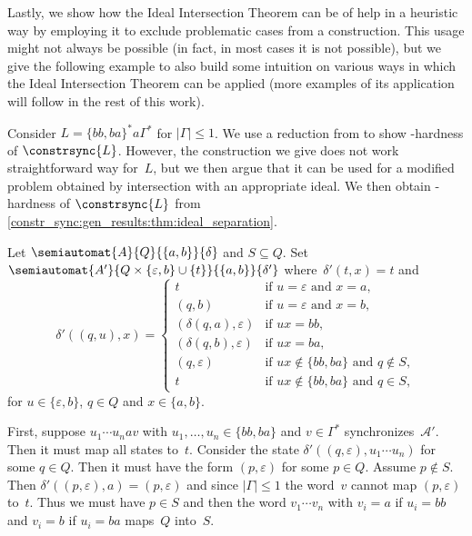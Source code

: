 Lastly, we show how the Ideal Intersection Theorem  can be of help
in a heuristic way by employing it to exclude problematic
cases from a construction. This usage might not always be possible (in fact, in most cases it is not 
possible),
but we give the following example to also build some intuition
on various ways in which the Ideal Intersection Theorem 
can be applied (more examples of its application 
will follow in the rest of this work).

\begin{remark} \label{constrsync:rem:construction-ideal-intersection}
	Consider $L = \{bb,ba\}^*a\Gamma^*$ for $|\Gamma|\le 1$.
	We use a reduction from \SIS
	to show \PSPACE-hardness of $\constrsync{L}$.
	However, the construction we give
	does not work straightforward way for~$L$,
	but we then argue that it can be
	used for a modified problem obtained by intersection with an appropriate ideal.
	We then obtain \PSPACE-hardness of $\constrsync{L}$
	from \cref{constr_sync:gen_results:thm:ideal_separation}.
	
	Let $\semiautomat{A}{Q}{\{a,b\}}{\delta}$ and $S \subseteq Q$.
	Set $\semiautomat{A'}{Q \times \{\varepsilon,b\} \cup \{t\}}{\{a,b\}}{\delta'}$
	where~$\delta'(t, x) = t$ and
	\[
	\delta'((q, u), x) =
	\begin{cases}
		t                           & \text{if } u = \varepsilon \text{ and } x = a, \\
		(q, b) & \text{if } u = \varepsilon \text{ and } x = b, \\
		(\delta(q, a), \varepsilon) & \text{if } ux = bb, \\
		(\delta(q, b), \varepsilon) & \text{if } ux = ba, \\
		(q, \varepsilon)            & \text{if } ux \notin \{bb,ba\} \text{ and } q \notin S, \\
		t							& \text{if } ux \notin \{bb,ba\} \text{ and } q \in S, 		
	\end{cases}
	\]
	for $u \in \{\varepsilon, b\}$, $q \in Q$ and $x \in \{a,b\}$.
	
	First, suppose $u_1 \cdots u_n a v$
	with $u_1, \ldots, u_n \in \{bb,ba\}$ and $v \in \Gamma^*$ 
	synchronizes~$\mathcal A'$.
	Then it must map all states to~$t$.
	Consider the state $\delta'((q, \varepsilon), u_1\cdots u_n)$
	for some $q \in Q$.
	Then it must have the form $(p, \varepsilon)$
	for some $p \in Q$.
	Assume $p \notin S$.
	Then $\delta'((p, \varepsilon), a) = (p, \varepsilon)$
	and since $|\Gamma|\le 1$
	the word~$v$ cannot map $(p, \varepsilon)$ to~$t$.
	Thus we must have $p \in S$
	and then the word $v_1 \cdots v_n$
	with $v_i = a$ if $u_i = bb$
	and $v_i = b$ if $u_i = ba$
	maps~$Q$ into~$S$.	
	

\end{remark}
